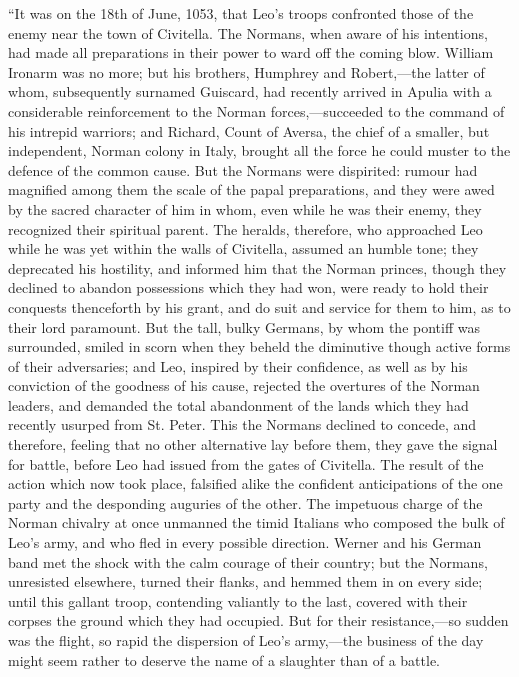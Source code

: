 ``It
was on the 18th of June, 1053, that Leo's troops confronted those of
the enemy near the town of Civitella. The Normans, when aware of his
intentions, had made all preparations in their power to ward off the
coming blow. William Ironarm was no more; but his brothers, Humphrey
and Robert,—the latter of whom, subsequently surnamed Guiscard, had
recently arrived in Apulia with a considerable reinforcement to the
Norman forces,—succeeded to the command of his intrepid warriors;
and Richard, Count of Aversa, the chief of a smaller, but independent,
Norman colony in Italy, brought all the force he could muster to the
defence of the common cause. But the Normans were dispirited: rumour
had magnified among them the scale of the papal preparations, and they
were awed by the sacred character of him in whom, even while he was
their enemy, they recognized their spiritual parent. The heralds,
therefore, who approached Leo while he was yet within the walls of
Civitella, assumed an humble tone; they deprecated his hostility, and
informed him that the Norman princes, though they declined to abandon
possessions which they had won, were ready to hold their conquests
thenceforth by his grant, and do suit and service for them to him, as
to their lord paramount. But the tall, bulky Germans, by whom the
pontiff was surrounded, smiled in scorn when they beheld the
diminutive though active forms of their adversaries; and Leo, inspired
by their confidence, as well as by his conviction of the goodness of
his cause, rejected the overtures of the Norman leaders, and demanded
the total abandonment of the lands which they had recently usurped
from St. Peter. This the Normans declined to concede, and therefore,
feeling that no other alternative lay before them, they gave the
signal for battle, before Leo
had issued from the gates of Civitella. The result of the action which
now took place, falsified alike the confident anticipations of the one
party and the desponding auguries of the other. The impetuous charge
of the Norman chivalry at once unmanned the timid Italians who
composed the bulk of Leo's army, and who fled in every possible
direction. Werner and his German band met the shock with the calm
courage of their country; but the Normans, unresisted elsewhere,
turned their flanks, and hemmed them in on every side; until this
gallant troop, contending valiantly to the last, covered with their
corpses the ground which they had occupied. But for their
resistance,—so sudden was the flight, so rapid the dispersion of Leo's
army,—the business of the day might seem rather to deserve the name
of a slaughter than of a battle.

